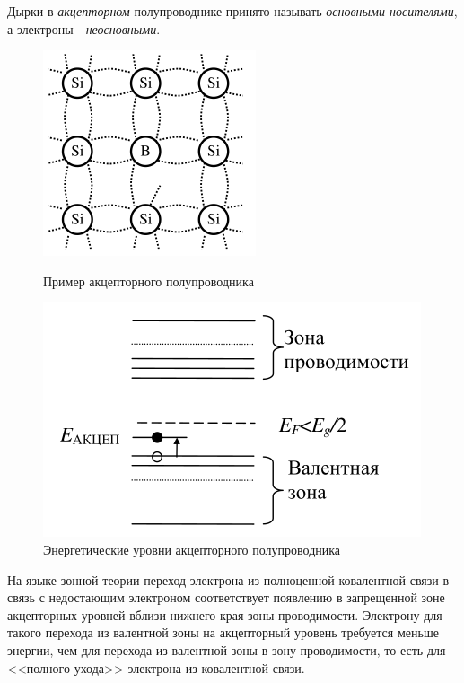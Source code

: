 Дырки в \textit{акцепторном} полупроводнике принято называть \textit{основными носителями}, а электроны - \textit{неосновными}.
\begin{figure}[H]
	\begin{minipage}{0.48\textwidth}
		\centering
		\includegraphics[width=0.7\linewidth]{img/oral-04/acceptor_poluprovodnik}
		\caption{Пример акцепторного полупроводника}
		\label{fig:acceptorpoluprovodnik}
	\end{minipage}\hfill
	\begin{minipage}{0.48\textwidth}
		\centering
		\includegraphics[width=\linewidth]{img/oral-04/acceptor_poluprovodnik1_energy}
		\caption{Энергетические уровни акцепторного полупроводника}
		\label{fig:acceptorpoluprovodnik1energy}
	\end{minipage}
\end{figure}

На языке зонной теории переход электрона из полноценной ковалентной связи в связь с недостающим электроном соответствует появлению в запрещенной зоне акцепторных уровней вблизи нижнего края зоны проводимости. Электрону для такого перехода из валентной зоны на акцепторный уровень требуется меньше энергии, чем для перехода из валентной зоны в зону проводимости, то есть для <<полного ухода>> электрона из ковалентной связи.


